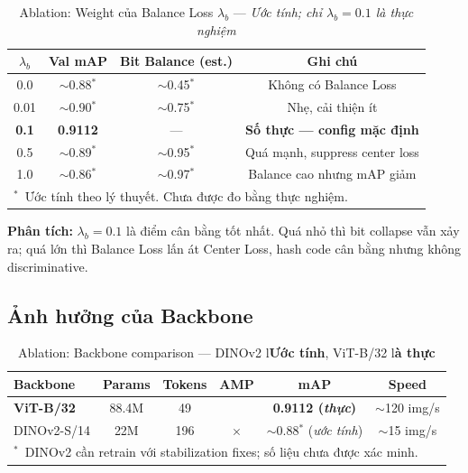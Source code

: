 \documentclass[13pt,a4paper]{article}
\newcommand{\tmark}{\checkmark}
\newcommand{\xmark}{$\times$}
\begin{document}
\begin{table}[H]
\centering
\caption{Ablation: Weight của Balance Loss $\lambda_b$ --- \textit{Ước tính; chỉ $\lambda_b=0.1$ là thực nghiệm}}
\label{tab:ablation_lambda}
\begin{tabular}{cccc}
\toprule
$\lambda_b$ & \textbf{Val mAP} & \textbf{Bit Balance (est.)} & \textbf{Ghi chú} \\
\midrule
0.0  & $\sim$0.88$^*$  & $\sim$0.45$^*$ & Không có Balance Loss \\
0.01 & $\sim$0.90$^*$  & $\sim$0.75$^*$ & Nhẹ, cải thiện ít \\
\textbf{0.1}  & \textbf{0.9112} & --- & \textbf{Số thực --- config mặc định} \\
0.5  & $\sim$0.89$^*$  & $\sim$0.95$^*$ & Quá mạnh, suppress center loss \\
1.0  & $\sim$0.86$^*$  & $\sim$0.97$^*$ & Balance cao nhưng mAP giảm \\
\bottomrule
\multicolumn{4}{l}{\small $^*$~Ước tính theo lý thuyết. Chưa được đo bằng thực nghiệm.}
\end{tabular}
\end{table}

\textbf{Phân tích:} $\lambda_b = 0.1$ là điểm cân bằng tốt nhất. Quá nhỏ thì bit collapse vẫn xảy ra; quá lớn thì Balance Loss lấn át Center Loss, hash code cân bằng nhưng không discriminative.


\subsection{Ảnh hưởng của Backbone}

\begin{table}[H]
\centering
\caption{Ablation: Backbone comparison --- DINOv2 l\textbf{Ước tính}, ViT-B/32 l\textbf{à thực}}
\label{tab:ablation_backbone}
\begin{tabular}{lccccc}
\toprule
\textbf{Backbone} & \textbf{Params} & \textbf{Tokens} & \textbf{AMP} & \textbf{mAP} & \textbf{Speed} \\
\midrule
\textbf{ViT-B/32} & 88.4M & 49  & \tmark & \textbf{0.9112 (\textit{thực})} & $\sim$120 img/s \\
DINOv2-S/14        & 22M   & 196 & \xmark & $\sim$0.88$^*$ (\textit{ước tính}) & $\sim$15 img/s \\
\bottomrule
\multicolumn{6}{l}{\small $^*$~DINOv2 cần retrain với stabilization fixes; số liệu chưa được xác minh.}
\end{tabular}
\end{table}
\end{document}
